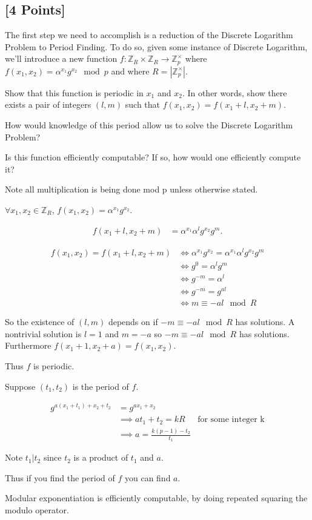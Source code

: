 \documentclass[11pt]{article}
\newcommand{\Z}{\mathbb{Z}}
\begin{document}
\subsection{[4 Points]} The first step we need to accomplish is a reduction of the Discrete Logarithm Problem to Period Finding. To do so, given some instance of Discrete Logarithm, we'll introduce a new function $f:\mathbb{Z}_R \times \mathbb{Z}_R \rightarrow \mathbb{Z}_p^\times$ where $f(x_1,x_2)= \alpha^{x_1} g^{x_2}\mod p$ and where $R=|\mathbb{Z}_p^\times|$. 


\noindent Show that this function is periodic in $x_1$ and $x_2$. In other words, show there exists a pair of integers $(l,m)$ such that $f(x_1,x_2)= f(x_1+l,x_2+m)$. 


\noindent How would knowledge of this period allow us to solve the Discrete Logarithm Problem? 

\noindent Is this function efficiently computable? If so, how would one efficiently compute it?

\begin{solution}
    Note all multiplication is being done mod p unless otherwise stated.

    $\forall x_1, x_2 \in \Z_R$, $f(x_1, x_2) = \alpha^{x_1}g^{x_2}$. 
    
    
    \begin{align*}
        f(x_1 + l, x_2 + m) &= \alpha^{x_1} \alpha^l g^{x_2}g^{m}. 
    \end{align*}

    \begin{align*}
        f(x_1, x_2) = f(x_1 + l, x_2 + m) &\iff \alpha^{x_1} g^{x_2} = \alpha^{x_1} \alpha^l g^{x_2}g^{m} \\
        & \iff g^0 = \alpha^l g^m \\
        & \iff g^{-m} = \alpha^{l} \\
        & \iff g^{-m} = g^{al} \\
        & \iff m \equiv -al \mod R 
    \end{align*}

    So the existence of $(l, m)$ depends on if $-m \equiv -a l \mod R$ has solutions. A nontrivial solution is $l = 1$ and $m = -a$ so $-m \equiv -a l \mod R$ has solutions. Furthermore $f(x_1 + 1, x_2 + a) =f(x_1, x_2)$. 

    Thus $f$ is periodic. 
    
    Suppose $(t_1, t_2)$ is the period of $f$. 
    
    \begin{align*}
        g^{a (x_1 + t_1) + x_2 + t_2} &= g^{ax_1 + x_2} \\
        &\implies at_1 + t_2 = kR & \text{for some integer k} \\
        &\implies a = \frac{k(p - 1) - t_2}{t_1}
    \end{align*} 

    Note $t_1 | t_2$ since $t_2$ is a product of $t_1$ and $a$.     

    Thus if you find the period of $f$ you can find $a$. 
    
    Modular exponentiation is efficiently computable, by doing repeated squaring the modulo operator. 
\end{solution}
\end{document}
